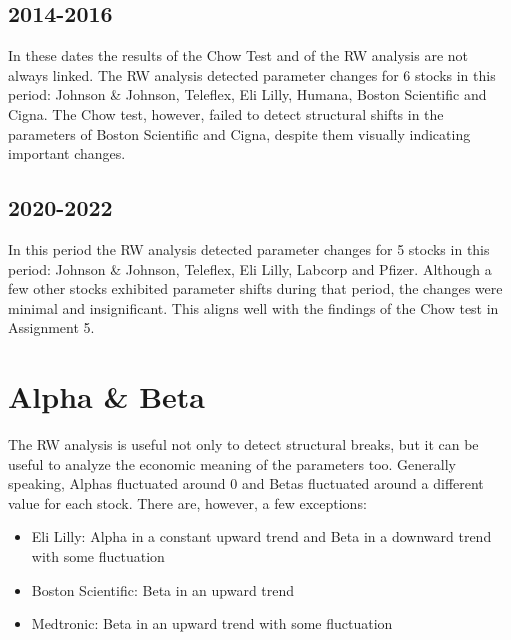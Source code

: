 
\subsection{2014-2016}

In these dates the results of the Chow Test and of the RW analysis are not always linked. 
The RW analysis detected parameter changes for 6 stocks in this period: Johnson \& Johnson, Teleflex, Eli Lilly, Humana,
Boston Scientific and Cigna.
The Chow test, however, failed to detect structural shifts in the parameters of Boston Scientific and Cigna, despite them 
visually indicating important changes.


\subsection{2020-2022}

In this period the RW analysis detected parameter changes for 5 stocks in this period: Johnson \& Johnson, Teleflex, Eli Lilly, 
Labcorp and Pfizer.
Although a few other stocks exhibited parameter shifts during that period, the changes were minimal and insignificant. 
This aligns well with the findings of the Chow test in Assignment 5.

\section{Alpha \& Beta}

The RW analysis is useful not only to detect structural breaks, but it can be useful to analyze the economic meaning of the
parameters too.
Generally speaking, Alphas fluctuated around 0 and Betas fluctuated around a different value for each stock.
There are, however, a few exceptions:
\begin{itemize}
    \item Eli Lilly: Alpha in a constant upward trend and Beta in a downward trend with some fluctuation
    \item Boston Scientific: Beta in an upward trend
    \item Medtronic: Beta in an upward trend with some fluctuation
\end{itemize}

